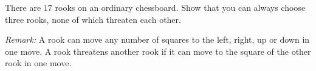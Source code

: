 There are $17$ rooks on an ordinary chessboard. Show that you can always choose three rooks,
none of which threaten each other.

\emph{Remark:} A rook can move any number of squares to the left, right,
up or down in one move. A rook threatens another rook if it can move to
the square of the other rook in one move.
